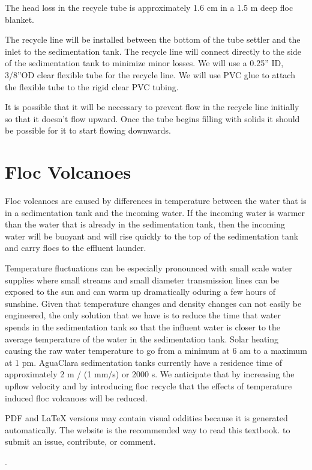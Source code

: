 \documentclass[letterpaper,10pt,english]{sphinxmanual}
\begin{document}
The head loss in the recycle tube is approximately 1.6 cm in a 1.5 m deep floc blanket.

The recycle line will be installed between the bottom of the tube settler and the inlet to the sedimentation tank. The recycle line will connect  directly to the side of the sedimentation tank to minimize minor losses. We will use a 0.25” ID, 3/8”OD clear flexible tube for the recycle line. We will use PVC glue to attach the flexible tube to the rigid clear PVC tubing.

It is possible that it will be necessary to prevent flow in the recycle line initially so that it doesn’t flow upward. Once the tube begins filling with solids it should be possible for it to start flowing downwards.


\section{Floc Volcanoes}
\label{\detokenize{Sedimentation/Sed_Theory_and_Future_Work:floc-volcanoes}}\label{\detokenize{Sedimentation/Sed_Theory_and_Future_Work:id3}}
Floc volcanoes are caused by differences in temperature between the water that is in a sedimentation tank and the incoming water. If the incoming water is warmer than the water that is already in the sedimentation tank, then the incoming water will be buoyant and will rise quickly to the top of the sedimentation tank and carry flocs to the effluent launder.

Temperature fluctuations can be especially pronounced with small scale water supplies where small streams and small diameter transmission lines can be exposed to the sun and can warm up dramatically oduring a few hours of sunshine. Given that temperature changes and density changes can not easily be engineered, the only solution that we have is to reduce the time that water spends in the sedimentation tank so that the influent water is closer to the average temperature of the water in the sedimentation tank. Solar heating causing the raw water temperature to go from a minimum at 6 am to a maximum at 1 pm. AguaClara sedimentation tanks currently have a residence time of approximately 2 m / (1 mm/s) or 2000 s. We anticipate that by increasing the upflow velocity and by introducing floc recycle that the effects of temperature induced floc volcanoes will be reduced.

\begin{footnote}[1]\sphinxAtStartFootnote
PDF and LaTeX versions may contain visual oddities because it is generated automatically. The website is the recommended way to read this textbook.  to submit an issue, contribute, or comment.
%
\end{footnote}.
\paragraph{}



\renewcommand{\indexname}{Index}
\printindex
\end{document}
